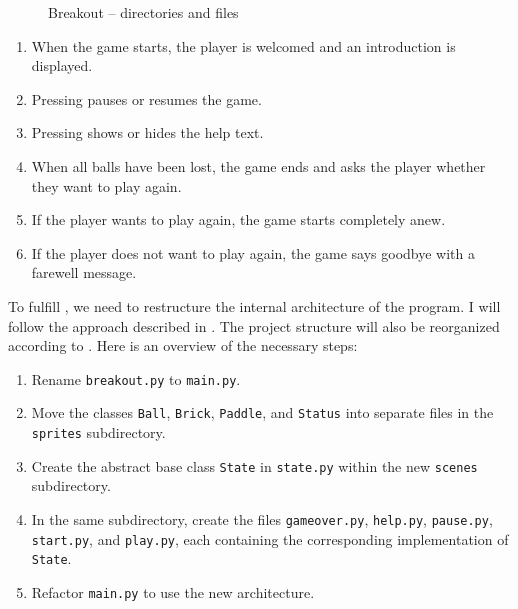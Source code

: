 \begin{figure}[htb]
	\caption{Breakout -- directories and files}\label{figBreakoutFiles}
\end{figure}

\begin{enumerate}
	\item When the game starts, the player is welcomed and an introduction is displayed.
	\item Pressing  pauses or resumes the game.
	\item Pressing  shows or hides the help text.
	\item When all balls have been lost, the game ends and asks the player whether they want to play again.
	\item If the player wants to play again, the game starts completely anew.
	\item If the player does not want to play again, the game says goodbye with a farewell message.
\end{enumerate}
\er

To fulfill , we need to restructure the internal architecture of the program. I will follow the approach described in . The project structure will also be reorganized according to . Here is an overview of the necessary steps:

\begin{enumerate}
	\item Rename \texttt{breakout.py} to \texttt{main.py}.
	\item Move the classes \texttt{Ball}, \texttt{Brick}, \texttt{Paddle}, and \texttt{Status} into separate files in the \texttt{sprites} subdirectory.
	\item Create the abstract base class \texttt{State} in \texttt{state.py} within the new \texttt{scenes} subdirectory.
	\item In the same subdirectory, create the files \texttt{gameover.py}, \texttt{help.py}, \texttt{pause.py}, \texttt{start.py}, and \texttt{play.py}, each containing the corresponding implementation of \texttt{State}.
	\item Refactor \texttt{main.py} to use the new architecture.
\end{enumerate}

